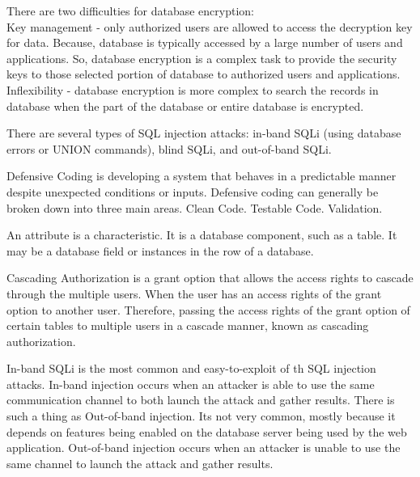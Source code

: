 \documentclass[]{subfiles}
\begin{document}

There are two difficulties for database encryption:
\\Key management - only authorized users are allowed to access the decryption key for
data. Because, database is typically accessed by a large number of users and
applications. So, database encryption is a complex task to provide the security keys to
those selected portion of database to authorized users and applications.
\\Inflexibility - database encryption is more complex to search the records in database
when the part of the database or entire database is encrypted.



There are several types of SQL injection attacks: in-band SQLi (using database errors
or UNION commands), blind SQLi, and out-of-band SQLi.


Defensive Coding is developing a system that behaves in a predictable manner despite
unexpected conditions or inputs.
Defensive coding can generally be broken down into three main areas. Clean Code.
Testable Code. Validation.


An attribute is a characteristic. It is a database component, such as a table. It may
be a database field or instances in the row of a database.


Cascading Authorization is a grant option that allows the access rights to
cascade through the multiple users. When the user has an access rights of the grant
option to another user. Therefore, passing the access rights of the grant option of
certain tables to multiple users in a cascade manner, known as cascading authorization.


In-band SQLi is the most common and easy-to-exploit of th SQL injection attacks.
In-band injection occurs when an attacker is able to use the same communication channel
to both launch the attack and gather results. There is such a thing as Out-of-band
injection. Its not very common, mostly because it depends on features being enabled on
the database server being used by the web application. Out-of-band injection occurs
when an attacker is unable to use the same channel to launch the attack and gather
results.
\end{document}
